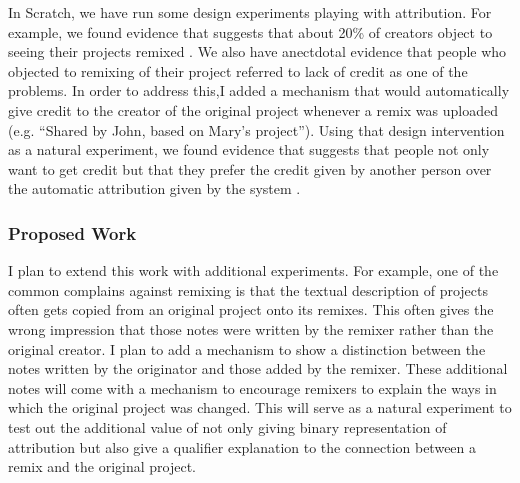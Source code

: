 In Scratch, we have run some design experiments playing with attribution. 
For example, we found evidence that suggests that about 20\% of creators object to seeing their projects remixed \citep{hill_responses_2010}.
We also have anectdotal evidence that people who objected to remixing of their project referred to lack of credit as one of the problems.
In order to address this,I added a mechanism that would automatically give credit to the creator of the original project whenever a remix was uploaded (e.g. ``Shared by John, based on Mary's project'').
Using that design intervention as a natural experiment, we found evidence that suggests that people not only want to get credit but that they prefer the credit given by another person over the automatic attribution given by the system \cite{monroy-hernandez_computers_2011}. 

\subsubsection{Proposed Work}
I plan to extend this work with additional experiments.
For example, one of the common complains against remixing is that the textual description of projects often gets copied from an original project onto its remixes.
This often gives the wrong impression that those notes were written by the remixer rather than the original creator.
I plan to add a mechanism to show a distinction between the notes written by the originator and those added by the remixer.
These additional notes will come with a mechanism to encourage remixers to explain the ways in which the original project was changed.
This will serve as a natural experiment to test out the additional value of not only giving binary representation of attribution but also give a qualifier explanation to the connection between a remix and the original project.


